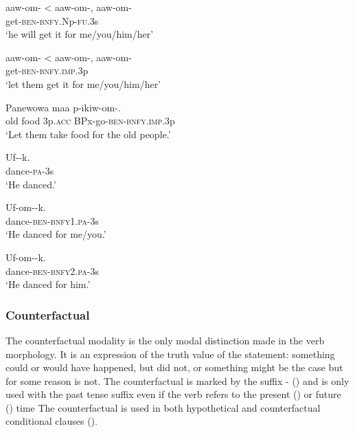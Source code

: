 \ea%
\label{ex:x444}
\gll aaw-om- {{\textless} aaw-om-}, aaw-om- \\
get-\textsc{ben}-\textsc{bnfy}.Np-\textsc{fu}.3s\\
\glt`he will get it for me/you/him/her'
\z

\ea%
\label{ex:x1750}
\gll aaw-om- {{\textless} aaw-om-}, aaw-om- \\
get-\textsc{ben}-\textsc{bnfy}.\textsc{imp}.3p\\
\glt`let them get it for me/you/him/her'
\z

\ea%
\label{ex:x445}
\gll Panewowa maa  p-ikiw-om-. \\
old food 3p.\textsc{acc} BPx-go-\textsc{ben}-\textsc{bnfy}.\textsc{imp}.3p\\
\glt`Let them take food for the old people.'
\z

\ea%
\label{ex:x494}
\gll Uf--k. \\
dance-\textsc{pa}-3s\\
\glt`He danced.'
\z

\ea%
\label{ex:x495}
\gll Uf-om--k. \\
dance-\textsc{ben}-\textsc{bnfy}1.\textsc{pa}-3s\\
\glt`He danced for me/you.'
\z

\ea%
\label{ex:x496}
\gll Uf-om--k. \\
dance-\textsc{ben}-\textsc{bnfy}2.\textsc{pa}-3s\\
\glt`He danced for him.'
\z

\subsubsection[Counterfactual]{Counterfactual}
{}
The counterfactual modality is the only modal distinction made in the verb morphology. It is an expression of the truth value of the statement: something could or would have happened, but did not, or something might be the case but for some reason is not. The counterfactual is marked by the suffix \nobreakdash- () and is only used with the past tense suffix even if the verb refers to the present () or future () time The counterfactual is used in both hypothetical and counterfactual conditional clauses (). 

